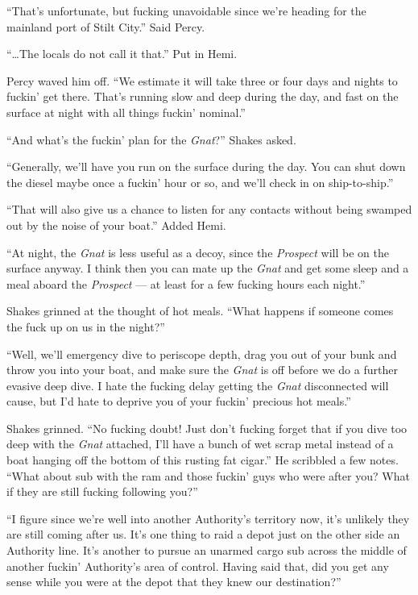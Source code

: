 \documentclass[]{scrbook}
\begin{document}
``That's unfortunate, but fucking unavoidable since we're heading for
the mainland port of Stilt City.'' Said Percy.

``\ldots{}The locals do not call it that.'' Put in Hemi.

Percy waved him off. ``We estimate it will take three or four days and
nights to fuckin' get there. That's running slow and deep during the
day, and fast on the surface at night with all things fuckin' nominal.''

``And what's the fuckin' plan for the \emph{Gnat}?'' Shakes asked.

``Generally, we'll have you run on the surface during the day. You can
shut down the diesel maybe once a fuckin' hour or so, and we'll check in
on ship-to-ship.''

``That will also give us a chance to listen for any contacts without
being swamped out by the noise of your boat.'' Added Hemi.

``At night, the \emph{Gnat} is less useful as a decoy, since the
\emph{Prospect} will be on the surface anyway. I think then you can mate
up the \emph{Gnat} and get some sleep and a meal aboard the
\emph{Prospect} --- at least for a few fucking hours each night.''

Shakes grinned at the thought of hot meals. ``What happens if someone
comes the fuck up on us in the night?''

``Well, we'll emergency dive to periscope depth, drag you out of your
bunk and throw you into your boat, and make sure the \emph{Gnat} is off
before we do a further evasive deep dive. I hate the fucking delay
getting the \emph{Gnat} disconnected will cause, but I'd hate to deprive
you of your fuckin' precious hot meals.''

Shakes grinned. ``No fucking doubt! Just don't fucking forget that if
you dive too deep with the \emph{Gnat} attached, I'll have a bunch of
wet scrap metal instead of a boat hanging off the bottom of this rusting
fat cigar.'' He scribbled a few notes. ``What about sub with the ram and
those fuckin' guys who were after you? What if they are still fucking
following you?''

``I figure since we're well into another Authority's territory now, it's
unlikely they are still coming after us. It's one thing to raid a depot
just on the other side an Authority line. It's another to pursue an
unarmed cargo sub across the middle of another fuckin' Authority's area
of control. Having said that, did you get any sense while you were at
the depot that they knew our destination?''
\end{document}
